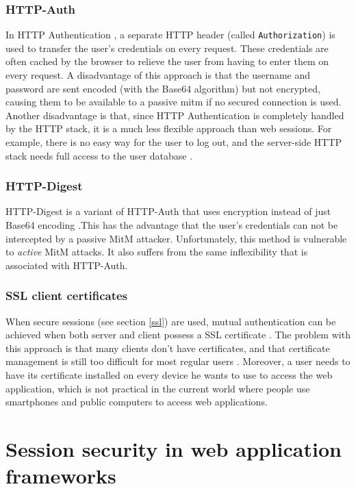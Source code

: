 \subsubsection{HTTP-Auth}
In HTTP Authentication \cite{rfc2617}, a separate HTTP header (called \texttt{Authorization}) is used to transfer the user's credentials on every request. These credentials are often cached by the browser to relieve the user from having to enter them on every request. A disadvantage of this approach is that the username and password are sent encoded (with the Base64 algorithm) but not encrypted, causing them to be available to a passive \gls{mitm} if no secured connection is used. Another disadvantage is that, since HTTP Authentication is completely handled by the HTTP stack, it is a much less flexible approach than web sessions. For example, there is no easy way for the user to log out, and the server-side HTTP stack needs full access to the user database \cite{Adida2008}.

\subsubsection{HTTP-Digest}
HTTP-Digest is a variant of HTTP-Auth that uses encryption instead of just Base64 encoding \cite{rfc2617}.This has the advantage that the user's credentials can not be intercepted by a passive MitM attacker. Unfortunately, this method is vulnerable to \emph{active} MitM attacks. It also suffers from the same inflexibility that is associated with HTTP-Auth.

\subsubsection{SSL client certificates}\label{certificates}
When secure sessions (see section \ref{ssl}) are used, mutual authentication can be achieved when both server and client possess a SSL certificate \cite{Park2000}. The problem with this approach is that many clients don't have certificates, and that certificate management is still too difficult for most regular users \cite{Whitten1999}. Moreover, a user needs to have its certificate installed on every device he wants to use to access the web application, which is not practical in the current world where people use smartphones and public computers to access web applications.

\section{Session security in web application frameworks}\label{frameworks}

